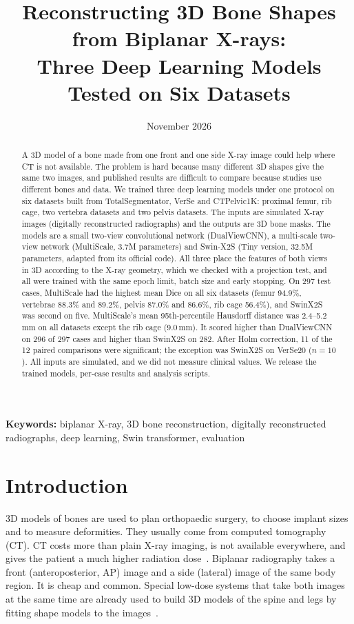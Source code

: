 \documentclass[11pt]{article}
\title{Reconstructing 3D Bone Shapes from Biplanar X-rays:\\Three Deep Learning Models Tested on Six Datasets}
\author{}
\date{November 2026}
\begin{document}
\maketitle

\begin{abstract}
\noindent
A 3D model of a bone made from one front and one side X-ray image could help where CT is not available. The problem is hard because many different 3D shapes give the same two images, and published results are difficult to compare because studies use different bones and data. We trained three deep learning models under one protocol on six datasets built from TotalSegmentator, VerSe and CTPelvic1K: proximal femur, rib cage, two vertebra datasets and two pelvis datasets. The inputs are simulated X-ray images (digitally reconstructed radiographs) and the outputs are 3D bone masks. The models are a small two-view convolutional network (DualViewCNN), a multi-scale two-view network (MultiScale, 3.7M parameters) and Swin-X2S (Tiny version, 32.5M parameters, adapted from its official code). All three place the features of both views in 3D according to the X-ray geometry, which we checked with a projection test, and all were trained with the same epoch limit, batch size and early stopping. On 297 test cases, MultiScale had the highest mean Dice on all six datasets (femur 94.9\%, vertebrae 88.3\% and 89.2\%, pelvis 87.0\% and 86.6\%, rib cage 56.4\%), and SwinX2S was second on five. MultiScale's mean 95th-percentile Hausdorff distance was 2.4--5.2\,mm on all datasets except the rib cage (9.0\,mm). It scored higher than DualViewCNN on 296 of 297 cases and higher than SwinX2S on 282. After Holm correction, 11 of the 12 paired comparisons were significant; the exception was SwinX2S on VerSe20 ($n=10$). All inputs are simulated, and we did not measure clinical values. We release the trained models, per-case results and analysis scripts.
\end{abstract}

\noindent\textbf{Keywords:} biplanar X-ray, 3D bone reconstruction, digitally reconstructed radiographs, deep learning, Swin transformer, evaluation

\section{Introduction}

3D models of bones are used to plan orthopaedic surgery, to choose implant sizes and to measure deformities. They usually come from computed tomography (CT). CT costs more than plain X-ray imaging, is not available everywhere, and gives the patient a much higher radiation dose~\cite{brenner2007}. Biplanar radiography takes a front (anteroposterior, AP) image and a side (lateral) image of the same body region. It is cheap and common. Special low-dose systems that take both images at the same time are already used to build 3D models of the spine and legs by fitting shape models to the images~\cite{dubousset2005,humbert2009,melhem2016}.
\end{document}
